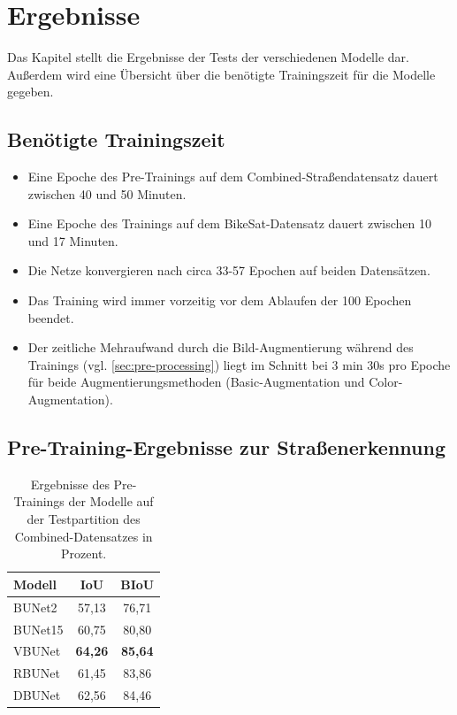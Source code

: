 \chapter{Ergebnisse} \label{sec:results}

Das Kapitel stellt die Ergebnisse der Tests der verschiedenen Modelle dar. Außerdem 
wird eine Übersicht über die benötigte Trainingszeit für die Modelle gegeben. 

\section{Benötigte Trainingszeit}

\begin{itemize}
    \item Eine Epoche des Pre-Trainings auf dem Combined-Straßendatensatz dauert zwischen 40 und 50 Minuten. 
    \item Eine Epoche des Trainings auf dem BikeSat-Datensatz dauert zwischen 10 und 17 Minuten. 
    \item Die Netze konvergieren nach circa 33-57 Epochen auf beiden Datensätzen. 
    \item Das Training wird immer vorzeitig vor dem Ablaufen der 100 Epochen beendet.
    \item Der zeitliche Mehraufwand durch die Bild-Augmentierung während des Trainings (vgl. \autoref{sec:pre-processing}) 
    liegt im Schnitt bei 3 min 30s pro Epoche für beide Augmentierungsmethoden (Basic-Augmentation und Color-Augmentation).  
\end{itemize}

\section{Pre-Training-Ergebnisse zur Straßenerkennung}

\begin{table}[ht]
	\centering
	\begin{tabular}{l|c|c}
		Modell & \ac{IoU} & \ac{BIoU} \\
		\midrule
        BUNet2 & 57,13 & 76,71 \\ 
        BUNet15 & 60,75 & 80,80 \\ 
        VBUNet & \textbf{64,26} & \textbf{85,64} \\ 
        RBUNet & 61,45 & 83,86 \\ 
        DBUNet & 62,56 & 84,46 \\ 
        
	\end{tabular}
	\caption{Ergebnisse des Pre-Trainings der Modelle auf der Testpartition des Combined-Datensatzes in Prozent.}
	\label{tab:results-roads}
\end{table}

